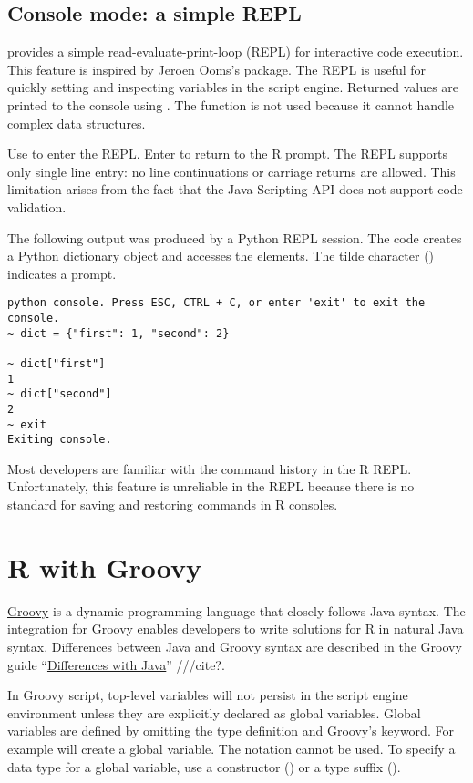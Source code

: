 \subsection{Console mode: a simple REPL}

 provides a simple read-evaluate-print-loop (REPL) for interactive code execution. This feature is inspired by Jeroen Ooms's  package. The REPL is useful for quickly setting and inspecting variables in the script engine. Returned values are printed to the console using . The  function is not used because it cannot handle complex data structures.

Use  to enter the REPL. Enter  to return to the R prompt. The REPL supports only single line entry: no line continuations or carriage returns are allowed. This limitation arises from the fact that the Java Scripting API does not support code validation.

The following output was produced by a Python REPL session. The code creates a Python dictionary object and accesses the elements. The tilde character (\samp{$\sim$}) indicates a prompt.

\begin{verbatim}
python console. Press ESC, CTRL + C, or enter 'exit' to exit the console.
~ dict = {"first": 1, "second": 2}

~ dict["first"]
1
~ dict["second"]
2
~ exit
Exiting console.
\end{verbatim}

Most developers are familiar with the command history in the R REPL.  Unfortunately, this feature is unreliable in the  REPL because there is no standard for saving and restoring commands in R consoles.

\section{R with Groovy}

\href{http://www.groovy-lang.org/}{Groovy} is a dynamic programming language that closely follows Java syntax. The  integration for Groovy enables developers to write solutions for R in natural Java syntax. Differences between Java and Groovy syntax are described in the Groovy guide “\href{http://groovy-lang.org/differences.html}{Differences with Java}” ///cite?.

 In Groovy script, top-level variables will not persist in the script engine environment unless they are explicitly declared as global variables. Global variables are defined by omitting the type definition and Groovy's  keyword. For example  will create a global variable. The  notation cannot be used. To specify a data type for a global variable, use a constructor () or a type suffix ().

